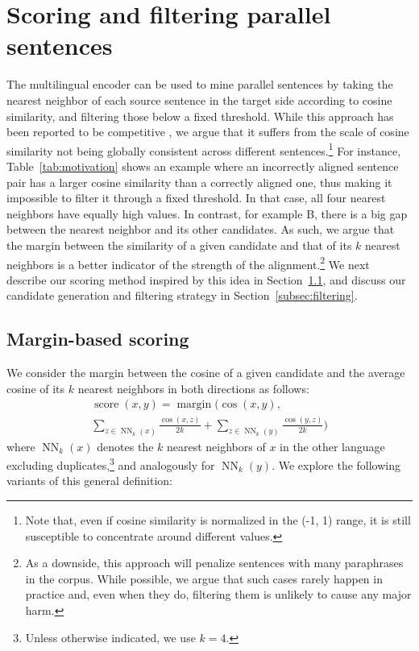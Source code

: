 \documentclass[11pt,a4paper]{article}
\DeclareMathOperator{\score}{score}
\DeclareMathOperator{\nn}{NN}
\DeclareMathOperator{\margin}{margin}
\begin{document}
\vspace{-0pt}
\section{Scoring and filtering parallel sentences}
\label{sec:mining}

The multilingual encoder can be used to mine parallel sentences by taking the nearest neighbor of each source sentence in the target side according to cosine similarity, and filtering those below a fixed threshold. While this approach has been reported to be competitive \citep{schwenk2018filtering}, we argue that it suffers from the scale of cosine similarity not being globally consistent across different sentences.\footnote{Note that, even if cosine similarity is normalized in the (-1, 1) range,
it is still susceptible to concentrate around different values.} For instance, Table~\ref{tab:motivation} shows an example where an incorrectly aligned sentence pair has a larger cosine similarity than a correctly aligned one, thus making it impossible to filter it through a fixed threshold. In that case, all four nearest neighbors have equally high values. In contrast, for example B, there is a big gap between the nearest neighbor and its other candidates. As such, we argue that the margin between the similarity of a given candidate and that of its $k$ nearest neighbors is a better indicator of the strength of the alignment.\footnote{As a downside, this approach will penalize sentences with many paraphrases in the corpus. While possible, we argue that such cases rarely happen in practice and, even when they do, filtering them is unlikely to cause any major harm.} We next describe our scoring method inspired by this idea in Section~\ref{subsec:scoring}, and discuss our candidate generation and filtering strategy in Section~\ref{subsec:filtering}.

\InsertFigArchi




\subsection{Margin-based scoring} \label{subsec:scoring}

We consider the margin between the cosine of a given candidate and the average cosine of its $k$ nearest neighbors in both directions as follows:
\begin{multline*}
    \score(x, y) = \margin (\cos(x, y), \\
    \sum_{z \in \nn_k(x)}{\frac{\cos(x, z)}{2k}} +  \sum_{z \in \nn_k(y)}{\frac{\cos(y, z)}{2k}})
\end{multline*}
where $\nn_k(x)$ denotes the $k$ nearest neighbors of $x$ in the other language excluding duplicates,\footnote{Unless otherwise indicated, we use $k=4$.} and analogously for $\nn_k(y)$. We explore the following variants of this general definition:
\end{document}
